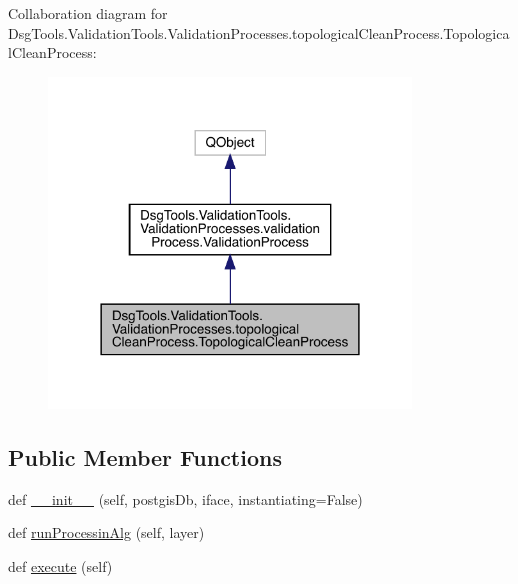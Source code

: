 Collaboration diagram for Dsg\+Tools.\+Validation\+Tools.\+Validation\+Processes.\+topological\+Clean\+Process.\+Topological\+Clean\+Process\+:
\nopagebreak
\begin{figure}[H]
\begin{center}
\leavevmode
\includegraphics[width=273pt]{class_dsg_tools_1_1_validation_tools_1_1_validation_processes_1_1topological_clean_process_1_1_t4fcf587d85f619816071ea4ce812569f}
\end{center}
\end{figure}
\subsection*{Public Member Functions}
\begin{DoxyCompactItemize}
\item 
def \mbox{\hyperlink{class_dsg_tools_1_1_validation_tools_1_1_validation_processes_1_1topological_clean_process_1_1_topological_clean_process_a24da4bf99695ecb8412956eb1020eb9a}{\+\_\+\+\_\+init\+\_\+\+\_\+}} (self, postgis\+Db, iface, instantiating=False)
\item 
def \mbox{\hyperlink{class_dsg_tools_1_1_validation_tools_1_1_validation_processes_1_1topological_clean_process_1_1_topological_clean_process_a7110c9d82f6a826525c0478fdf9fc359}{run\+Processin\+Alg}} (self, layer)
\item 
def \mbox{\hyperlink{class_dsg_tools_1_1_validation_tools_1_1_validation_processes_1_1topological_clean_process_1_1_topological_clean_process_a67417a70b898ce1af57f2e3962839956}{execute}} (self)
\end{DoxyCompactItemize}
